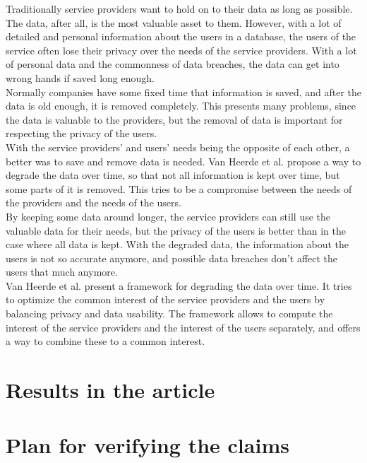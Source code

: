 \documentclass[a4paper,12pt,oneside,fleqn]{article}
\begin{document}
Traditionally service providers want to hold on to their data as long
as possible. The data, after all, is the most valuable asset to
them. However, with a lot of detailed and personal information about
the users in a database, the users of the service often lose their
privacy over the needs of the service providers. With a lot of
personal data and the commonness of data breaches, the data can get
into wrong hands if saved long enough.\\

Normally companies have some fixed time that information is saved, and
after the data is old enough, it is removed completely. This presents
many problems, since the data is valuable to the providers, but the
removal of data is important for respecting the privacy of the
users.\\

With the service providers' and users' needs being the opposite of
each other, a better was to save and remove data is needed. Van Heerde
et al. propose a way to degrade the data over time, so that not all
information is kept over time, but some parts of it is removed. This
tries to be a compromise between the needs of the providers and the
needs of the users.\\

By keeping some data around longer, the service providers can still
use the valuable data for their needs, but the privacy of the users is
better than in the case where all data is kept. With the degraded
data, the information about the users is not so accurate anymore, and
possible data breaches don't affect the users that much anymore.\\

Van Heerde et al. present a framework for degrading the data over
time. It tries to optimize the common interest of the service
providers and the users by balancing privacy and data usability. The
framework allows to compute the interest of the service providers and
the interest of the users separately, and offers a way to combine
these to a common interest.

\section{Results in the article}



\section{Plan for verifying the claims}
\end{document}
